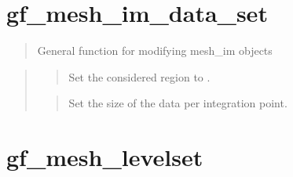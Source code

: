 \documentclass[a4paper,11pt,english]{sphinxmanual}
\begin{document}
\section{gf\_mesh\_im\_data\_set}
\label{\detokenize{matlab_octave/cmdref_gf_mesh_im_data_set:gf-mesh-im-data-set}}\label{\detokenize{matlab_octave/cmdref_gf_mesh_im_data_set::doc}}
\sphinxAtStartPar
{}

\begin{sphinxVerbatim}[commandchars=\\\{\}]
    
  
\end{sphinxVerbatim}

\sphinxAtStartPar
{}
\begin{quote}

\sphinxAtStartPar
General function for modifying mesh\_im objects
\end{quote}

\sphinxAtStartPar
{}
\begin{quote}

\sphinxAtStartPar
{}
\begin{quote}

\sphinxAtStartPar
Set the considered region to .
\end{quote}

\sphinxAtStartPar
{}
\begin{quote}

\sphinxAtStartPar
Set the size of the data per integration point.
\end{quote}
\end{quote}


\section{gf\_mesh\_levelset}
\label{\detokenize{matlab_octave/cmdref_gf_mesh_levelset:gf-mesh-levelset}}\label{\detokenize{matlab_octave/cmdref_gf_mesh_levelset::doc}}
\sphinxAtStartPar
{}
\end{document}
